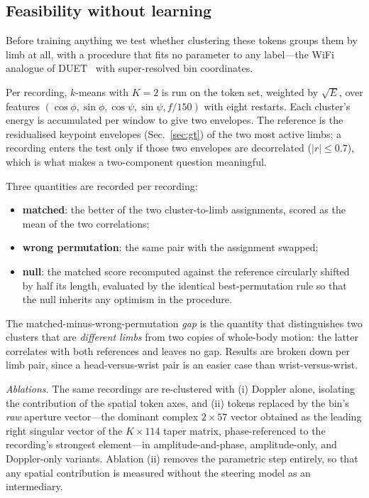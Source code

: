 \documentclass[conference]{IEEEtran}
\begin{document}
\subsection{Feasibility without learning}
\label{sec:feas}

Before training anything we test whether clustering these tokens groups them by
limb at all, with a procedure that fits no parameter to any label---the
WiFi analogue of DUET~\cite{yilmaz2004duet} with super-resolved bin
coordinates.

Per recording, $k$-means with $K = 2$ is run on the token set, weighted by
$\sqrt{E}$, over features
$(\cos\phi, \sin\phi, \cos\psi, \sin\psi, f/150)$ with eight restarts. Each
cluster's energy is accumulated per window to give two envelopes. The reference
is the residualised keypoint envelopes (Sec.~\ref{sec:gt}) of the two most
active limbs; a recording enters the test only if those two envelopes are
decorrelated ($|r| \le 0.7$), which is what makes a two-component question
meaningful.

Three quantities are recorded per recording:
\begin{itemize}
\item \textbf{matched}: the better of the two cluster-to-limb assignments,
scored as the mean of the two correlations;
\item \textbf{wrong permutation}: the same pair with the assignment swapped;
\item \textbf{null}: the matched score recomputed against the reference
circularly shifted by half its length, evaluated by the identical
best-permutation rule so that the null inherits any optimism in the procedure.
\end{itemize}
The matched-minus-wrong-permutation \emph{gap} is the quantity that
distinguishes two clusters that are \emph{different limbs} from two copies of
whole-body motion: the latter correlates with both references and leaves no
gap. Results are broken down per limb pair, since a head-versus-wrist pair is
an easier case than wrist-versus-wrist.

\emph{Ablations.} The same recordings are re-clustered with (i) Doppler alone,
isolating the contribution of the spatial token axes, and (ii) tokens replaced
by the bin's \emph{raw} aperture vector---the dominant complex
$2\times 57$ vector obtained as the leading right singular vector of the
$K \times 114$ taper matrix, phase-referenced to the recording's strongest
element---in amplitude-and-phase, amplitude-only, and Doppler-only variants.
Ablation (ii) removes the parametric step entirely, so that any spatial
contribution is measured without the steering model as an intermediary.
\end{document}

